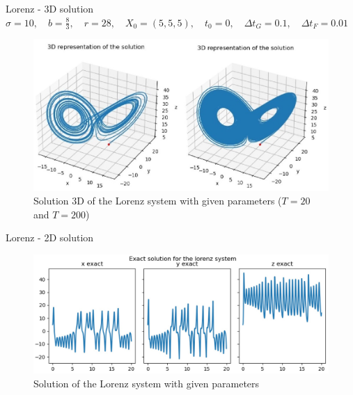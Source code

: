 \begin{frame}{Lorenz - 3D solution}
	$\sigma=10, \quad b=\frac{8}{3}, \quad r=28, \quad X_0=(5,5,5), \quad t_0=0, \quad \Delta t_G=0.1, \quad \Delta t_F=0.01$
	\begin{figure}
		\centering
		\includegraphics[width=0.7\linewidth]{"images/parareal/lorenz_sol3D.jpg"}
		\caption{Solution 3D of the Lorenz system with given parameters ($T=20$ and $T=200$)}
	\end{figure}

	\end{frame}
	\begin{frame}{Lorenz - 2D solution}

	\begin{minipage}{\linewidth}
	\begin{figure} 
		\centering     
		\includegraphics[width=\linewidth]{"images/parareal/lorenz_exact.jpg"}
		\caption{Solution of the Lorenz system with given parameters}
	\end{figure}
	\end{minipage}

	\end{frame}
